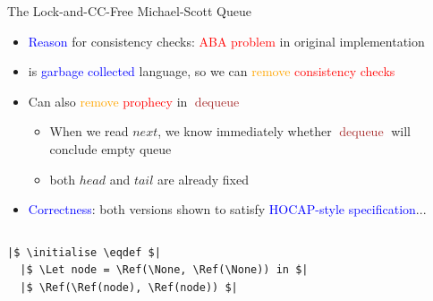 \documentclass[9pt,xcolor={dvipsnames}]{beamer}
\newcommand{\initialise}{\operatorname{initialize}}
\newcommand{\dequeue}{\operatorname{dequeue}}
\begin{document}
\begin{frame}[fragile]{The Lock-and-CC-Free Michael-Scott Queue}
  \begin{itemize}
    \item \textcolor{blue}{Reason} for consistency checks: \textcolor{red}{ABA problem} in original implementation
    \pause
    \item \heaplang{} is \textcolor{blue}{garbage collected} language, so we can \textcolor{orange}{remove} \textcolor{red}{consistency checks}
    \item Can also \textcolor{orange}{remove} \textcolor{red}{prophecy} in \textcolor{Brown}{$\dequeue$}
      \begin{itemize}
        \item When we read $next$, we know immediately whether \textcolor{Brown}{$\dequeue$} will conclude empty queue
        \item both $head$ and $tail$ are already fixed
      \end{itemize}
    \item<3-> \textcolor{blue}{Correctness}: both versions shown to satisfy \textcolor{blue}{HOCAP-style specification}...
  \end{itemize}
  \vspace{-12pt}
  \begin{columns}
    \begin{column}{0.5\textwidth}
      \begin{verbatim}
|$ \initialise \eqdef $|
  |$ \Let node = \Ref(\None, \Ref(\None)) in $|
  |$ \Ref(\Ref(node), \Ref(node)) $|


\end{verbatim}
\end{column}
\end{columns}
\end{frame}
\end{document}
